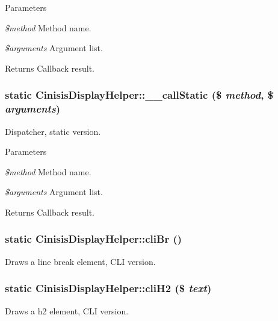 \begin{DoxyParams}{Parameters}
\item[{\em \$method}]Method name.\item[{\em \$arguments}]Argument list.\end{DoxyParams}
\begin{DoxyReturn}{Returns}
Callback result. 
\end{DoxyReturn}
\hypertarget{classCinisisDisplayHelper_abae906d7606b7d76ef5ed754835ba7e2}{
\subsubsection[{\_\-\_\-callStatic}]{\setlength{\rightskip}{0pt plus 5cm}static CinisisDisplayHelper::\_\-\_\-callStatic (\$ {\em method}, \/  \$ {\em arguments})}}
\label{classCinisisDisplayHelper_abae906d7606b7d76ef5ed754835ba7e2}
Dispatcher, static version.


\begin{DoxyParams}{Parameters}
\item[{\em \$method}]Method name.\item[{\em \$arguments}]Argument list.\end{DoxyParams}
\begin{DoxyReturn}{Returns}
Callback result. 
\end{DoxyReturn}
\hypertarget{classCinisisDisplayHelper_ad61db99c9d639678c96879aa34288323}{
\subsubsection[{cliBr}]{\setlength{\rightskip}{0pt plus 5cm}static CinisisDisplayHelper::cliBr ()}}
\label{classCinisisDisplayHelper_ad61db99c9d639678c96879aa34288323}
Draws a line break element, CLI version. \hypertarget{classCinisisDisplayHelper_aa15ca1975a280814a1cdc2df82b8c67d}{
\subsubsection[{cliH2}]{\setlength{\rightskip}{0pt plus 5cm}static CinisisDisplayHelper::cliH2 (\$ {\em text})}}
\label{classCinisisDisplayHelper_aa15ca1975a280814a1cdc2df82b8c67d}
Draws a h2 element, CLI version.


